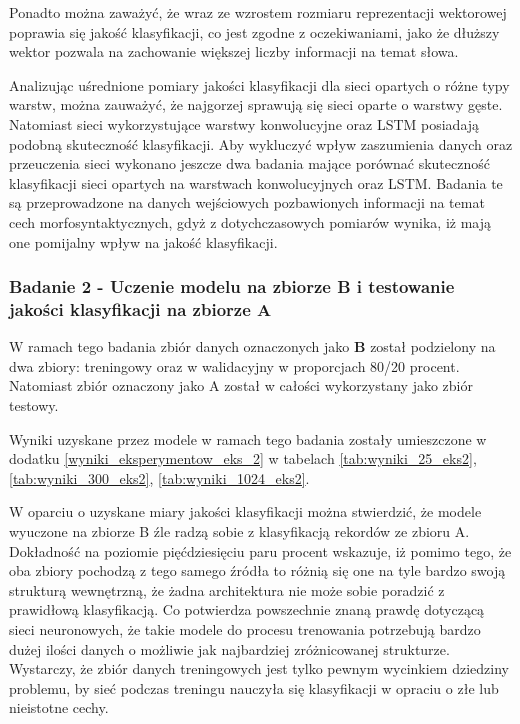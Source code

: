 Ponadto można zaważyć, że wraz ze wzrostem rozmiaru reprezentacji wektorowej poprawia się jakość klasyfikacji, co jest zgodne z oczekiwaniami, jako że dłuższy wektor pozwala na zachowanie większej liczby informacji na temat słowa.


Analizując uśrednione pomiary jakości klasyfikacji dla sieci opartych o różne typy warstw, można zauważyć, że najgorzej sprawują się sieci oparte o warstwy gęste. Natomiast sieci wykorzystujące warstwy konwolucyjne oraz LSTM posiadają podobną skuteczność klasyfikacji. Aby wykluczyć wpływ zaszumienia danych oraz przeuczenia sieci wykonano jeszcze dwa badania mające porównać skuteczność klasyfikacji sieci opartych na warstwach konwolucyjnych oraz LSTM. Badania te są przeprowadzone na danych wejściowych pozbawionych informacji na temat cech morfosyntaktycznych, gdyż z dotychczasowych pomiarów wynika, iż mają one pomijalny wpływ na jakość klasyfikacji.


\subsubsection{Badanie 2 - Uczenie modelu na zbiorze B i testowanie jakości klasyfikacji na zbiorze A }

W ramach tego badania zbiór danych oznaczonych jako \textbf{B} został podzielony na dwa zbiory: treningowy oraz w walidacyjny w proporcjach 80/20 procent. Natomiast zbiór oznaczony jako A został w całości wykorzystany jako zbiór testowy.

Wyniki uzyskane przez modele w ramach tego badania zostały umieszczone w dodatku \ref{wyniki_eksperymentow_eks_2} w tabelach \ref{tab:wyniki_25_eks2}, \ref{tab:wyniki_300_eks2}, \ref{tab:wyniki_1024_eks2}.


W oparciu o uzyskane miary jakości klasyfikacji można stwierdzić, że modele wyuczone na zbiorze B źle radzą sobie z klasyfikacją rekordów ze zbioru A. Dokładność na poziomie pięćdziesięciu paru procent wskazuje, iż pomimo tego, że oba zbiory pochodzą z tego samego źródła to różnią się one na tyle bardzo swoją strukturą wewnętrzną, że żadna architektura nie może sobie poradzić z prawidłową klasyfikacją. Co potwierdza powszechnie znaną prawdę dotyczącą sieci neuronowych, że takie modele do procesu trenowania potrzebują bardzo dużej ilości danych o możliwie jak najbardziej zróżnicowanej strukturze. Wystarczy, że zbiór danych treningowych jest tylko pewnym wycinkiem dziedziny problemu, by sieć podczas treningu nauczyła się klasyfikacji w opraciu o złe lub nieistotne cechy.


